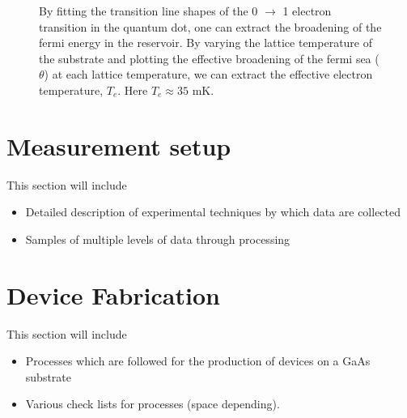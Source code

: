 \label{sec:electrontemp}
\begin{figure}[h]
\centering
{}
\caption{By fitting the transition line shapes of the 0 $\to$ 1 electron transition in the quantum dot, one can extract the broadening of the fermi energy in the reservoir. By varying the lattice temperature of the substrate and plotting the effective broadening of the fermi sea ($\theta$) at each lattice temperature, we can extract the effective electron temperature, $T_e$. Here $T_e \approx 35$ mK. }

\label{fig:etemp}       %
\end{figure}

\chapter{Measurement setup}
This section will include 
\begin{itemize}
\item Detailed description of experimental techniques by which data are collected
\item Samples of multiple levels of data through processing
\end{itemize}

\chapter{Device Fabrication}
This section will include 
\begin{itemize}
\item Processes which are followed for the production of devices on a GaAs substrate
\item Various check lists for processes (space depending).
\end{itemize}
